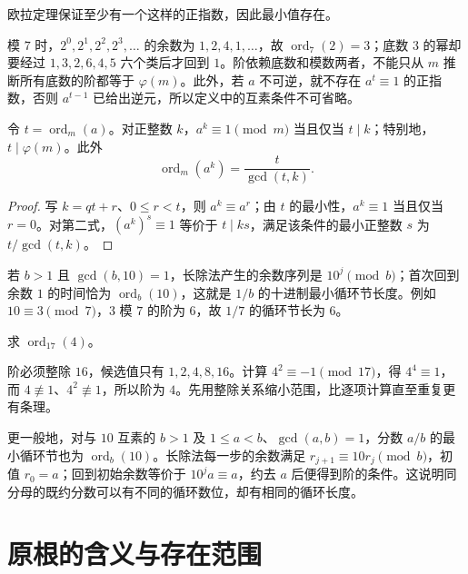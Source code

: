 \documentclass[UTF8,12pt,a4paper,fontset=fandol]{ctexbook}
\begin{document}
欧拉定理保证至少有一个这样的正指数，因此最小值存在。

模 $7$ 时，$2^0,2^1,2^2,2^3,\ldots$ 的余数为 $1,2,4,1,\ldots$，故 $\operatorname{ord}_7(2)=3$；底数 $3$ 的幂却要经过 $1,3,2,6,4,5$ 六个类后才回到 $1$。阶依赖底数和模数两者，不能只从 $m$ 推断所有底数的阶都等于 $\varphi(m)$。此外，若 $a$ 不可逆，就不存在 $a^t\equiv1$ 的正指数，否则 $a^{t-1}$ 已给出逆元，所以定义中的互素条件不可省略。

\begin{proposition}
\label{prop:order}
令 $t=\operatorname{ord}_m(a)$。对正整数 $k$，$a^k\equiv1\pmod m$ 当且仅当 $t\mid k$；特别地，$t\mid\varphi(m)$。此外
\begin{equation}
 \operatorname{ord}_m(a^k)=\frac{t}{\gcd(t,k)}.
 \label{eq:order-power}
\end{equation}
\end{proposition}
\begin{proof}
写 $k=qt+r$、$0\le r<t$，则 $a^k\equiv a^r$；由 $t$ 的最小性，$a^k\equiv1$ 当且仅当 $r=0$。对第二式，$(a^k)^s\equiv1$ 等价于 $t\mid ks$，满足该条件的最小正整数 $s$ 为 $t/\gcd(t,k)$。
\end{proof}

若 $b>1$ 且 $\gcd(b,10)=1$，长除法产生的余数序列是 $10^j\pmod b$；首次回到余数 $1$ 的时间恰为 $\operatorname{ord}_b(10)$，这就是 $1/b$ 的十进制最小循环节长度。例如 $10\equiv3\pmod7$，$3$ 模 $7$ 的阶为 $6$，故 $1/7$ 的循环节长为 $6$。

\begin{example}
求 $\operatorname{ord}_{17}(4)$。
\end{example}
\begin{solve}
阶必须整除 $16$，候选值只有 $1,2,4,8,16$。计算 $4^2\equiv-1\pmod{17}$，得 $4^4\equiv1$，而 $4\not\equiv1$、$4^2\not\equiv1$，所以阶为 $4$。先用整除关系缩小范围，比逐项计算直至重复更有条理。
\end{solve}

更一般地，对与 $10$ 互素的 $b>1$ 及 $1\le a<b$、$\gcd(a,b)=1$，分数 $a/b$ 的最小循环节也为 $\operatorname{ord}_b(10)$。长除法每一步的余数满足 $r_{j+1}\equiv10r_j\pmod b$，初值 $r_0=a$；回到初始余数等价于 $10^ja\equiv a$，约去 $a$ 后便得到阶的条件。这说明同分母的既约分数可以有不同的循环数位，却有相同的循环长度。

\section{原根的含义与存在范围}
\end{document}

